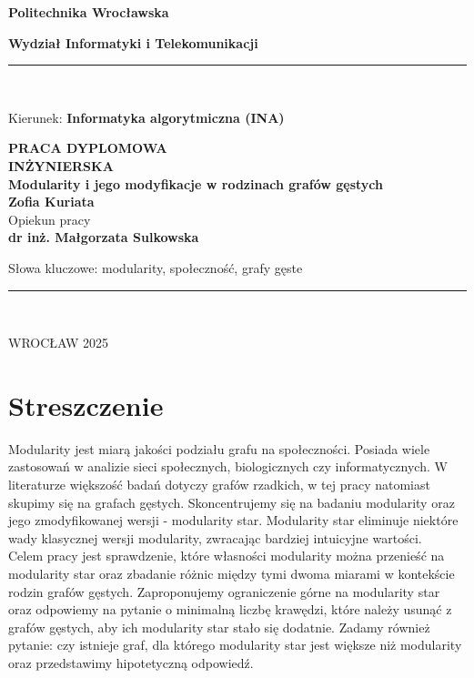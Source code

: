 \documentclass[letterpaper,12pt]{article}
\begin{document}
\begin{titlepage}
  \centering
  {\Large\bfseries Politechnika Wrocławska \par}

  {\large\bfseries Wydział Informatyki i Telekomunikacji \par}
  \rule{\textwidth}{0.2pt}\\[1cm]

  {\raggedright
  {\small Kierunek:}
  {\small\bfseries Informatyka algorytmiczna (INA)}\\[3cm]}

  {\Huge\bfseries PRACA DYPLOMOWA\\[4mm] INŻYNIERSKA}\\[3cm]

  {\huge\bfseries Modularity i jego modyfikacje w rodzinach grafów gęstych}\\[1.5cm]

  {\LARGE\bfseries Zofia Kuriata}\\[2cm]

  {\Large Opiekun pracy}\\[3mm]
  {\Large\bfseries dr inż. Małgorzata Sulkowska}\\[2.5cm]

  {\raggedright
  {\large Słowa kluczowe: modularity, społeczność, grafy gęste}\\[3mm]
  \rule{\textwidth}{0.6pt}\\}

  {\large WROCŁAW 2025}
\end{titlepage}

\newpage
\section*{Streszczenie}
Modularity jest miarą jakości podziału grafu na społeczności. Posiada wiele zastosowań w analizie sieci społecznych, biologicznych czy informatycznych. W literaturze większość badań dotyczy grafów rzadkich, w tej pracy natomiast skupimy się na grafach gęstych. Skoncentrujemy się na badaniu modularity oraz jego zmodyfikowanej wersji - modularity star. Modularity star eliminuje niektóre wady klasycznej wersji modularity, zwracając bardziej intuicyjne wartości.\\
\indent Celem pracy jest sprawdzenie, które własności modularity można przenieść na modularity star oraz zbadanie różnic między tymi dwoma miarami w kontekście rodzin grafów gęstych. Zaproponujemy ograniczenie górne na modularity star oraz odpowiemy na pytanie o minimalną liczbę krawędzi, które należy usunąć z grafów gęstych, aby ich modularity star stało się dodatnie. Zadamy również pytanie: czy istnieje graf, dla którego modularity star jest większe niż modularity oraz przedstawimy hipotetyczną odpowiedź.
\end{document}
